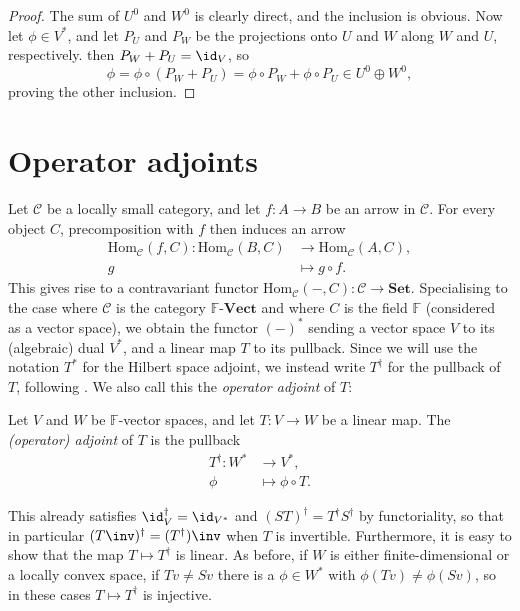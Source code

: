 \documentclass[a4paper, 11pt]{memoir}
\theoremstyle{plaincustomnumber}
\theoremstyle{changedotbreakcustomnumber}
\newcommand{\calC}{\mathcal{C}}
\newcommand{\field}{\mathbb{F}}
\begin{document}
\begin{proof}
    The sum of $U^0$ and $W^0$ is clearly direct, and the inclusion \textquote{$\supseteq$} is obvious. Now let $\phi \in V^*$, and let $P_U$ and $P_W$ be the projections onto $U$ and $W$ along $W$ and $U$, respectively. then $P_W + P_U = \id_V$, so
    \begin{equation*}
        \phi
            = \phi \circ (P_W + P_U)
            = \phi \circ P_W + \phi \circ P_U
            \in U^0 \oplus W^0,
    \end{equation*}
    proving the other inclusion.
\end{proof}


\section{Operator adjoints}\label{sec:operator-adjoints}

\renewcommand{\hom}[1][]{\mathrm{Hom}_{#1}}

\newpar

Let $\calC$ be a locally small category, and let $f \colon A \to B$ be an arrow in $\calC$. For every object $C$, precomposition with $f$ then induces an arrow
%
\begin{align*}
    \hom[\calC](f,C) \colon \hom[\calC](B,C) &\to \hom[\calC](A,C), \\
        g &\mapsto g \circ f.
\end{align*}
%
This gives rise to a contravariant functor $\hom[\calC](-,C) \colon \calC \to \mathbf{Set}$. Specialising to the case where $\calC$ is the category $\field\text{-}\mathbf{Vect}$ and where $C$ is the field $\field$ (considered as a vector space), we obtain the functor $(-)^*$ sending a vector space $V$ to its (algebraic) dual $V^*$, and a linear map $T$ to its pullback. Since we will use the notation $T^*$ for the Hilbert space adjoint, we instead write $T^\dagger$ for the pullback of $T$, following \textcite{follandrealanalysis}. We also call this the \emph{operator adjoint} of $T$:

\begin{definition}
    Let $V$ and $W$ be $\field$-vector spaces, and let $T \colon V \to W$ be a linear map. The \emph{(operator) adjoint} of $T$ is the pullback
    \begin{align*}
        T^\dagger \colon W^* &\to V^*, \\
        \phi &\mapsto \phi \circ T.
    \end{align*}
\end{definition}
%
This already satisfies $\id_V^\dagger = \id_{V^*}$ and $(ST)^\dagger = T^\dagger S^\dagger$ by functoriality, so that in particular $(T\inv)^\dagger = (T^\dagger)\inv$ when $T$ is invertible. Furthermore, it is easy to show that the map $T \mapsto T^\dagger$ is linear. As before, if $W$ is either finite-dimensional or a locally convex space, if $Tv \neq Sv$ there is a $\phi \in W^*$ with $\phi(Tv) \neq \phi(Sv)$, so in these cases $T \mapsto T^\dagger$ is injective.
\end{document}
